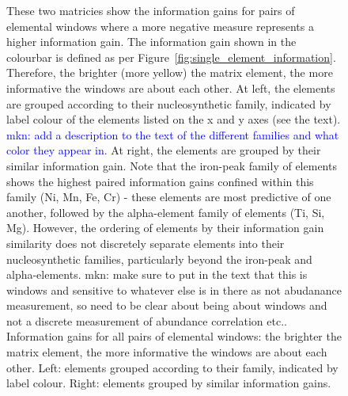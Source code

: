 \documentclass[a4paper,fleqn,usenatbib]{mnras}
\begin{document}
\begin{figure}
    \caption{These two matricies show the information gains for pairs of elemental windows where a more negative measure represents a higher information gain. The information gain shown in the colourbar is defined as per  Figure~\ref{fig:single_element_information}. Therefore, the brighter (more yellow) the matrix element, the more informative the windows are about each other. At left, the elements are grouped according to their nucleosynthetic family, indicated by label colour of the elements listed on the x and y axes (see the text). \textcolor{blue}{mkn: add a description to the text of the different families and what color they appear in}. At right, the elements are grouped by their similar information gain. Note that the iron-peak family of elements shows the highest paired information gains confined within this family (Ni, Mn, Fe, Cr) - these elements are most predictive of one another, followed by the alpha-element family of elements (Ti, Si, Mg). However, the ordering of elements by their information gain similarity does not discretely separate elements into their nucleosynthetic families, particularly beyond the iron-peak and alpha-elements. {mkn: make sure to put in the text that this is windows and sensitive to whatever else is in there as not abudanance measurement, so need to be clear about being about windows and not a discrete measurement of abundance correlation etc.}. Information gains for all pairs of elemental windows: the brighter the matrix element, the more informative the windows are about each other. Left: elements grouped according to their family, indicated by label colour. Right: elements grouped by similar information gains.}
    \label{fig:all_element_information}
\end{figure}
\end{document}
